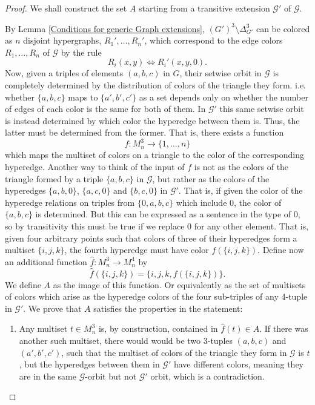 \documentclass[10pt,a4paper]{amsart}
\def\graph{\mathcal{G}}
\newcommand{\set}[1]{\{#1 \}}
\begin{document}
\begin{proof}
    We shall construct the set $A$ starting from a transitive extension $\graph'$ of $\graph$.

    By Lemma \ref{Conditions for generic Graph extensions}, $(G')^3\setminus \Delta_{G '}^3$ can be colored as $n$ disjoint hypergraphs, $R_1', \dots, R_n'$, which correspond to the edge colors $R_1, \dots, R_n$ of $\graph$ by the rule
    $$R_i(x,y) \Longleftrightarrow R_i'(x,y, 0).$$
    Now, given a triples of elements $(a,b,c)$ in ${G}$, their setwise orbit in $\graph$ is completely determined by the distribution of colors of the triangle they form. i.e. whether $\set{a,b,c}$ maps to $\set{a', b', c'}$ as a set depends only on whether the number of edges of each color is the same for both of them. In $\graph'$ this same setwise orbit is instead determined by which color the hyperedge between them is. Thus, the latter must be determined from the former. That is, there exists a function
    $$f : M_n^3 \rightarrow \set{1, \dots,n}$$
    which maps the multiset of colors on a triangle to the color of the corresponding hyperedge. Another way to think of the input of $f$ is not as the colors of the triangle formed by a triple $\{a,b,c\}$ in $\graph$, but rather as the colors of the hyperedges $\{a, b, 0\}$, $\{a, c, 0\}$ and $\{b, c, 0\}$ in $\graph'$. That is, if given the color of the hyperedge relations on triples from $\set{0, a,b,c}$ which include $0$, the color of $\{a,b,c\}$ is determined. But this can be expressed as a sentence in the type of $0$, so by transitivity this must be true if we replace $0$ for any other element. That is, given four arbitrary points such that colors of three of their hyperedges form a multiset $\set{i, j, k}$, the fourth hyperedge must have color $f(\set{i, j, k})$. Define now an additional function $\hat{f}: M_n^3 \rightarrow M_n^4$ by
    $$\hat{f}(\set{i,j,k}) = \set{i, j, k, {f}(\set{i,j,k})}.$$
    We define $A$ as the image of this function. Or equivalently as the set of multisets of colors which arise as the hyperedge colors of the four sub-triples of any 4-tuple in $\graph'$. We prove that $A$ satisfies the properties in the statement:
    \begin{enumerate}
        \item Any multiset $t \in M_n^3$ is, by construction, contained in $\hat f(t) \in A$. If there was another such multiset, there would would be two 3-tuples $(a,b,c)$ and $(a', b', c')$, such that the multiset of colors of the triangle they form in $\graph$ is $t$, but the hyperedges between them in $\graph'$ have different colors, meaning they are in the same $\graph$-orbit but not $\graph'$ orbit, which is a contradiction.


\end{enumerate}
\end{proof}
\end{document}
